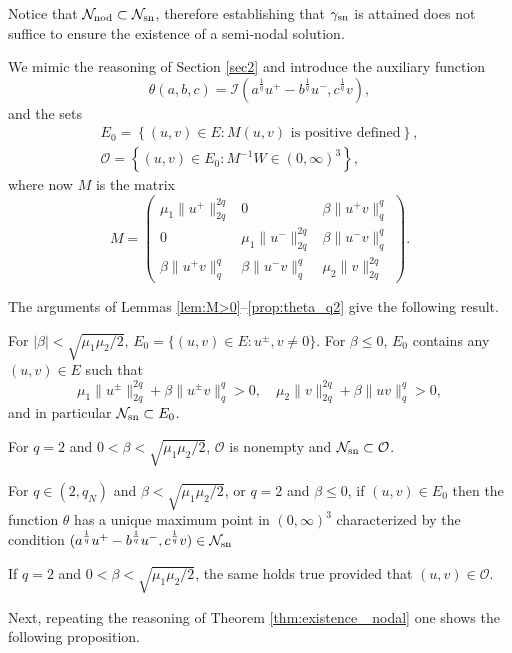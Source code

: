 \documentclass[reqno]{amsart}
\begin{document}
Notice that $\mathcal N_{\rm nod}\subset \mathcal N_{\rm sn}$, therefore establishing
that $\gamma_{\rm sn}$ is attained  does not suffice  to ensure the existence of a
semi-nodal solution.

We mimic the reasoning of Section \ref{sec2} and introduce the auxiliary function
\[
\theta(a,b,c)=\mathcal I (a^{\frac{1}{q}} u^+
 - b^{\frac{1}{q}}u^-, c^{\frac{1}{q}} v),
 \]
and the sets
\begin{gather*}
 E_0 = \left\{ (u,v)\in E : M(u,v) \text{ is positive defined}\right\},
\\
  \mathcal O = \left\{ (u,v) \in E_0 :  M^{-1} W \in (0,\infty)^3\right\} ,
\end{gather*}
where now $M$ is the matrix
\[
M=\begin{pmatrix} \mu_1\|u^+\|_{2q}^{2q} & 0 & \beta \|u^+v\|_q^q \\
 0&  \mu_1\|u^-\|_{2q}^{2q} & \beta \|u^-v\|_q^q \\
 \beta \|u^+v\|_q^q & \beta \|u^-v\|_q^q &  \mu_2 \|v\|_{2q}^{2q}
\end{pmatrix} .
\]

The arguments of Lemmas \ref{lem:M>0}--\ref{prop:theta_q2}
give the following result.

\begin{lemma}\label{lem:snod}
For $|\beta|<\sqrt{\mu_1\mu_2/2}$,  $E_0=\{ (u,v) \in E : u^{\pm}, v \neq 0\}$.
For $\beta \le 0$,  $E_0$ contains any $(u,v)\in E$ such that
\begin{equation*}
\mu_1 \|u^{\pm}\|_{2q}^{2q} + \beta \|u^{\pm} v\|_{q}^q>0, \quad
\mu_2 \|v\|_{2q}^{2q} +\beta \|u v\|_{q}^q >0,
\end{equation*}
and in particular $\mathcal N_{\rm sn}\subset E_0$.

For $q=2$ and $0<\beta < \sqrt{\mu_1\mu_2/2}$, $\mathcal O$ is nonempty and
 $\mathcal N_{\rm sn}\subset \mathcal O$.

For $q\in (2,q_N)$ and $\beta<\sqrt{\mu_1\mu_2/2}$, or $q=2$ and $\beta \le 0$,
if $(u,v)\in  E_0$ then the function
$\theta$ has a unique maximum point in $ (0,\infty)^3$ characterized by the condition
$(a^{\frac{1}q} u^+ -b^{\frac{1}q} u^-, c^{\frac{1}q} v) \in \mathcal N_{\rm sn}$

If $q=2$ and $0<\beta< \sqrt{\mu_1\mu_2/2}$, the same holds true provided that
$(u,v)\in \mathcal O$.
\end{lemma}

Next, repeating the reasoning of Theorem \ref{thm:existence_ nodal} one shows
the following proposition.
\end{document}
